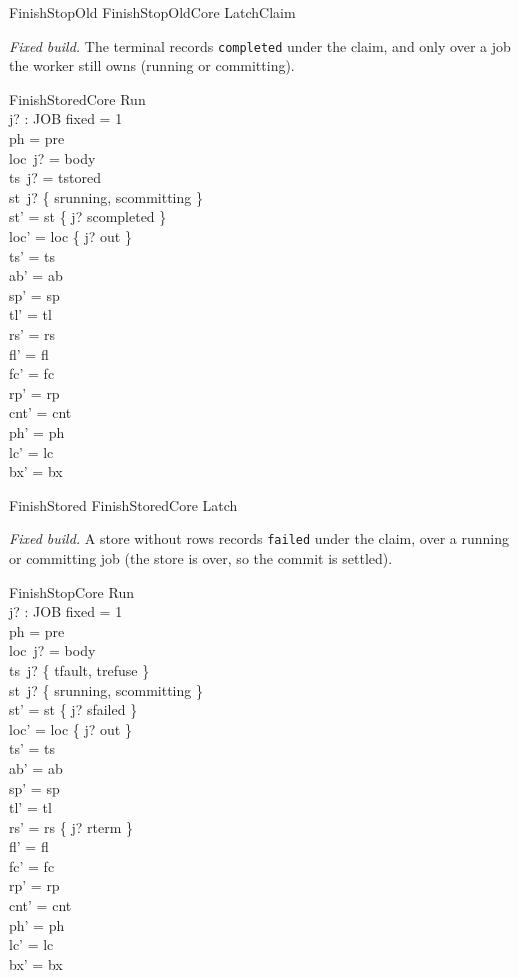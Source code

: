 \documentclass[a4paper,10pt,fleqn]{article}
\newcommand{\field}[1]{\texttt{#1}}
\begin{document}
\begin{zed}
FinishStopOld  FinishStopOldCore \land LatchClaim
\end{zed}

\emph{Fixed build.} The terminal records \field{completed} under the claim, and
only over a job the worker still owns (running or committing).

\begin{schema}{FinishStoredCore}
\Delta Run \\ j? : JOB
\where
fixed = 1 \\
ph = pre \\
loc~j? = body \\
ts~j? = tstored \\
st~j? \in \{ srunning, scommitting \} \\
st' = st \oplus \{ j? \mapsto scompleted \} \\
loc' = loc \oplus \{ j? \mapsto out \} \\
ts' = ts \\
ab' = ab \\
sp' = sp \\
tl' = tl \\
rs' = rs \\
fl' = fl \\
fc' = fc \\
rp' = rp \\
cnt' = cnt \\
ph' = ph \\
lc' = lc \\
bx' = bx
\end{schema}

\begin{zed}
FinishStored  FinishStoredCore \land Latch
\end{zed}

\emph{Fixed build.} A store without rows records \field{failed} under the claim,
over a running or committing job (the store is over, so the commit is settled).

\begin{schema}{FinishStopCore}
\Delta Run \\ j? : JOB
\where
fixed = 1 \\
ph = pre \\
loc~j? = body \\
ts~j? \in \{ tfault, trefuse \} \\
st~j? \in \{ srunning, scommitting \} \\
st' = st \oplus \{ j? \mapsto sfailed \} \\
loc' = loc \oplus \{ j? \mapsto out \} \\
ts' = ts \\
ab' = ab \\
sp' = sp \\
tl' = tl \\
rs' = rs \oplus \{ j? \mapsto rterm \} \\
fl' = fl \\
fc' = fc \\
rp' = rp \\
cnt' = cnt \\
ph' = ph \\
lc' = lc \\
bx' = bx
\end{schema}
\end{document}
